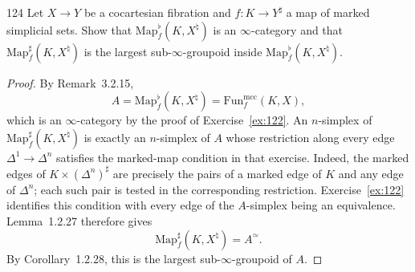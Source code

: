\begin{exercise}{124}
Let $X\to Y$ be a cocartesian fibration and $f\colon K\to Y^{\sharp}$ a map of marked
simplicial sets. Show that $\mathrm{Map}^{\flat}_f(K,X^{\natural})$ is an $\infty$-category and that $\mathrm{Map}^{\sharp}_f(K,X^{\natural})$ is the
largest sub-$\infty$-groupoid inside $\mathrm{Map}^{\flat}_f(K,X^{\natural})$.

\begin{proof}
By Remark~3.2.15,
\[
 A=\mathrm{Map}^{\flat}_f(K,X^{\natural})
   =\mathrm{Fun}^{\mathrm{mcc}}_f(K,X),
\]
which is an $\infty$-category by the proof of Exercise~\ref{ex:122}.
An $n$-simplex of $\mathrm{Map}^{\sharp}_f(K,X^{\natural})$ is exactly
an $n$-simplex of $A$ whose restriction along every edge
$\Delta^1\to\Delta^n$ satisfies the marked-map condition in that exercise.
Indeed, the marked edges of $K\times(\Delta^n)^{\sharp}$ are precisely
the pairs of a marked edge of $K$ and any edge of $\Delta^n$;
each such pair is tested in the corresponding restriction.
Exercise~\ref{ex:122} identifies this condition with every edge of the
$A$-simplex being an equivalence.
Lemma~1.2.27 therefore gives
\[
 \mathrm{Map}^{\sharp}_f(K,X^{\natural})=A^{\simeq}.
\]
By Corollary~1.2.28, this is the largest sub-$\infty$-groupoid of $A$.
\end{proof}
\end{exercise}
